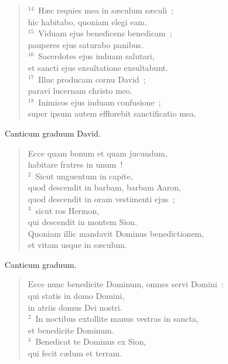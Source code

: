 \begin{flushleft}
\begin{verse}
${}^{14}$~H\ae c requies mea in s\ae culum s\ae culi~;\\ hic habitabo, quoniam elegi eam.\\
${}^{15}$~Viduam ejus benedicens benedicam~;\\ pauperes ejus saturabo panibus.\\
${}^{16}$~Sacerdotes ejus induam salutari,\\ et sancti ejus exsultatione exsultabunt.\\
${}^{17}$~Illuc producam cornu David~;\\ paravi lucernam christo meo.\\
${}^{18}$~Inimicos ejus induam confusione~;\\ super ipsum autem efflorebit sanctificatio mea.\end{verse}\end{flushleft}



\bchapter
\lettrine[lines=3,image=true,loversize=0.05,lraise=-0.03]{C}{}anticum graduum David. \begin{flushleft}\begin{verse}\vspace{6pt}Ecce quam bonum et quam jucundum,\\ habitare fratres in unum~!\\
${}^{2}$~Sicut unguentum in capite,\\ quod descendit in barbam, barbam Aaron,\\ quod descendit in oram vestimenti ejus~;\\
${}^{3}$~sicut ros Hermon,\\ qui descendit in montem Sion.\\ Quoniam illic mandavit Dominus benedictionem,\\ et vitam usque in s\ae culum.\end{verse}\end{flushleft}



\bchapter
\lettrine[lines=3,image=true,loversize=0.05,lraise=-0.03]{C}{}anticum graduum. \begin{flushleft}\begin{verse}\vspace{6pt}Ecce nunc benedicite Dominum, omnes servi Domini~:\\ qui statis in domo Domini,\\ in atriis domus Dei nostri.\\
${}^{2}$~In noctibus extollite manus vestras in sancta,\\ et benedicite Dominum.\\
${}^{3}$~Benedicat te Dominus ex Sion,\\ qui fecit c\ae lum et terram.\end{verse}\end{flushleft}



